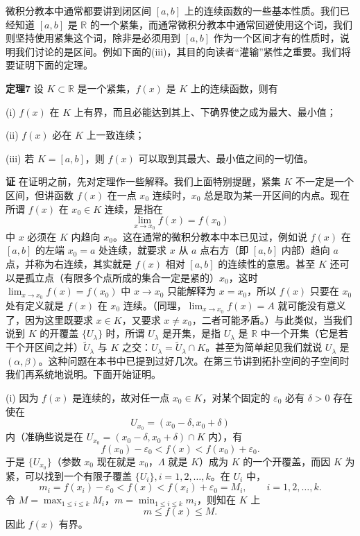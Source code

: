微积分教本中通常都要讲到闭区间 $[a,b]$ 上的连续函数的一些基本性质。我们已经知道 $[a,b]$ 是 $\mathbb R$ 的一个紧集，而通常微积分教本中通常回避使用这个词，我们则坚持使用紧集这个词，除非是必须用到 $[a,b]$ 作为一个区间才有的性质时，说明我们讨论的是区间。例如下面的(iii)，其目的向读者“灌输”紧性之重要。我们将要证明下面的定理。

\noindent\textbf{定理7}\quad
设 $K\subset\mathbb R$ 是一个紧集，$f(x)$ 是 $K$ 上的连续函数，则有

\noindent (i) $f(x)$ 在 $K$ 上有界，而且必能达到其上、下确界使之成为最大、最小值；

\noindent (ii) $f(x)$ 必在 $K$ 上一致连续；

\noindent (iii) 若 $K=[a,b]$，则 $f(x)$ 可以取到其最大、最小值之间的一切值。

\noindent\textbf{证}\quad
在证明之前，先对定理作一些解释。我们上面特别提醒，紧集 $K$ 不一定是一个区间，但讲函数 $f(x)$ 在一点 $x_0$ 连续时，$x_0$ 总是取为某一开区间的内点。现在所谓 $f(x)$ 在 $x_0\in K$ 连续，是指在
\[
 \lim_{x\to x_0}f(x)=f(x_0)
\]
中 $x$ 必须在 $K$ 内趋向 $x_0$。这在通常的微积分教本中本已见过，例如说 $f(x)$ 在 $[a,b]$ 的左端 $x_0=a$ 处连续，就要求 $x$ 从 $a$ 点右方（即 $[a,b]$ 内部）趋向 $a$ 点，并称为右连续，其实就是 $f(x)$ 相对 $[a,b]$ 的连续性的意思。甚至 $K$ 还可以是孤立点（有限多个点所成的集合一定是紧的）$x_0$，这时 $\lim_{x\to x_0}f(x)=f(x_0)$ 中 $x\to x_0$ 只能解释为 $x=x_0$，所以 $f(x)$ 只要在 $x_0$ 处有定义就是 $f(x)$ 在 $x_0$ 连续。（同理，$\lim_{x\to x_0}f(x)=A$ 就可能没有意义了，因为这里既要求 $x\in K$，又要求 $x\ne x_0$，二者可能矛盾。）与此类似，当我们说到 $K$ 的开覆盖 $\{U_\lambda\}$ 时，所谓 $U_\lambda$ 是开集，是指 $U_\lambda$ 是 $\mathbb R$ 中一个开集（它是若干个开区间之并）$\widetilde U_\lambda$ 与 $K$ 之交：$U_\lambda=\widetilde U_\lambda\cap K$。甚至为简单起见我们就说 $U_\lambda$ 是 $(\alpha,\beta)$。这种问题在本书中已提到过好几次。在第三节讲到拓扑空间的子空间时我们再系统地说明。下面开始证明。

(i) 因为 $f(x)$ 是连续的，故对任一点 $x_0\in K$，对某个固定的 $\varepsilon_0$ 必有 $\delta>0$ 存在使在
\[
 U_{x_0}=(x_0-\delta,x_0+\delta)
\]
内（准确些说是在 $U_{x_0}=(x_0-\delta,x_0+\delta)\cap K$ 内），有
\begin{equation}
 f(x_0)-\varepsilon_0<f(x)<f(x_0)+\varepsilon_0.
 \tag{4}
\end{equation}
于是 $\{U_{x_0}\}$（参数 $x_0$ 现在就是 $x_0$，$\Lambda$ 就是 $K$）成为 $K$ 的一个开覆盖，而因 $K$ 为紧，可以找到一个有限子覆盖 $\{U_i\},i=1,2,\ldots,k$。在 $U_i$ 中，
\begin{equation}
 m_i=f(x_i)-\varepsilon_0<f(x)<f(x_i)+\varepsilon_0=M_i,
 \qquad i=1,2,\ldots,k.
 \tag{5}
\end{equation}
令 $M=\max_{1\le i\le k}M_i$，$m=\min_{1\le i\le k}m_i$，则知在 $K$ 上
\[
 m\le f(x)\le M.
\]
因此 $f(x)$ 有界。


